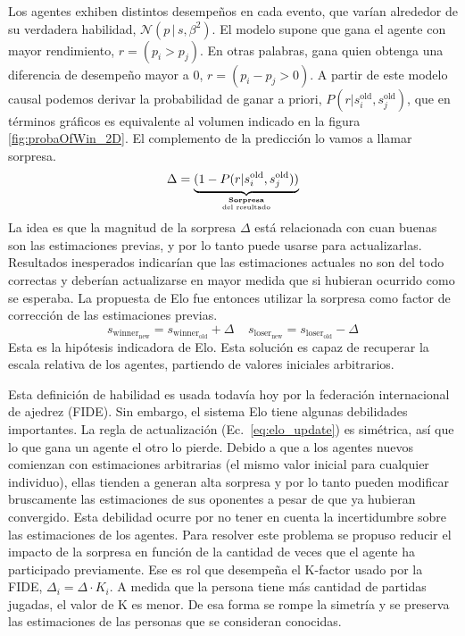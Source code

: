 \documentclass[a4paper,10pt]{book}
\newcommand{\N}{\mathcal{N}}
\newcommand\hfrac[2]{\genfrac{}{}{0pt}{}{#1}{#2}} %
\theoremstyle{definition}
\begin{document}
%
Los agentes exhiben distintos desempe\~nos en cada evento, que var\'ian alrededor de su verdadera habilidad, $\N(p\,|\,s,\beta^2)$.
%
El modelo supone que gana el agente con mayor rendimiento, $r = (p_i > p_j)$.
%
En otras palabras, gana quien obtenga una diferencia de desempe\~no mayor a 0, $r = (p_i - p_j > 0)$.
%
A partir de este modelo causal podemos derivar la probabilidad de ganar a priori, $P(r|s_i^{\text{old}},s_j^{\text{old}})$, que en términos gráficos es equivalente al volumen indicado en la figura \ref{fig:probaOfWin_2D}.
%
El complemento de la predicción lo vamos a llamar sorpresa.
%
\begin{equation*}
 \Delta = \underbrace{(1 - P(r|s_i^{\text{old}},s_j^{\text{old}}))}_{\hfrac{\textbf{Sorpresa}}{\text{del resultado}}}
\end{equation*}
%
La idea es que la magnitud de la sorpresa $\Delta$ est\'a relacionada con cuan buenas son las estimaciones previas, y por lo tanto puede usarse para actualizarlas.
%
Resultados inesperados indicar\'ian que las estimaciones actuales no son del todo correctas y deber\'ian actualizarse en mayor medida que si hubieran ocurrido como se esperaba.
%
La propuesta de Elo fue entonces utilizar la sorpresa como factor de corrección de las estimaciones previas.
%
\begin{equation}\label{eq:elo_update}
 s_{\text{winner}_\text{new}} = s_{\text{winner}_\text{old}} + \Delta \ \ \ \ \ s_{\text{loser}_\text{new}} = s_{\text{loser}_\text{old}} - \Delta 
\end{equation}
%
Esta es la hip\'otesis indicadora de Elo.
%
Esta soluci\'on es capaz de recuperar la escala relativa de los agentes, partiendo de valores iniciales arbitrarios.
%
\begin{center}
\end{center}
%
Esta definici\'on de habilidad es usada todav\'ia hoy por la federaci\'on internacional de ajedrez (FIDE).
%
Sin embargo, el sistema Elo tiene algunas debilidades importantes.
%
La regla de actualizaci\'on (Ec.~\eqref{eq:elo_update}) es sim\'etrica, as\'i que lo que gana un agente el otro lo pierde.
%
Debido a que a los agentes nuevos comienzan con estimaciones arbitrarias (el mismo valor inicial para cualquier individuo), ellas tienden a generan alta sorpresa y por lo tanto pueden modificar bruscamente las estimaciones de sus oponentes a pesar de que ya hubieran convergido.
%
Esta debilidad ocurre por no tener en cuenta la incertidumbre sobre las estimaciones de los agentes.
%
Para resolver este problema se propuso reducir el impacto de la sorpresa en funci\'on de la cantidad de veces que el agente ha participado previamente.
%
Ese es rol que desempe\~na el K-factor usado por la FIDE, $\Delta_i = \Delta \cdot K_i$.
%
A medida que la persona tiene más cantidad de partidas jugadas, el valor de K es menor.
%
De esa forma se rompe la simetría y se preserva las estimaciones de las personas que se consideran conocidas.
\end{document}
